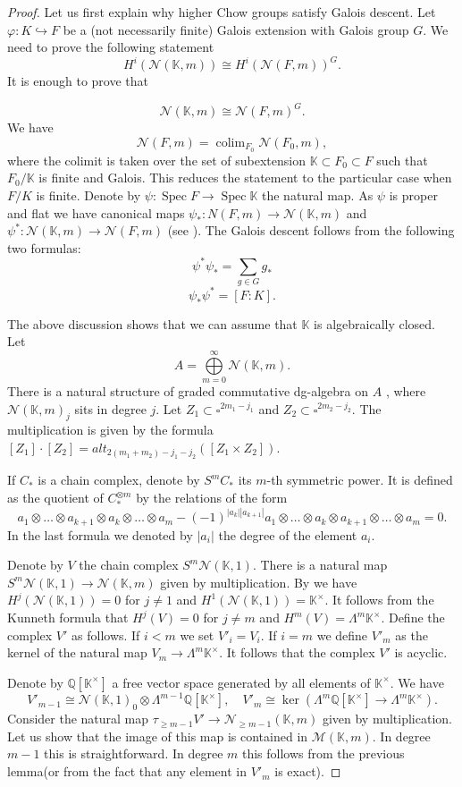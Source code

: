 \documentclass[12pt]{extarticle}
\def\mb{\mathbb}
\def\mc{\mathcal}
\def\k{\mb K}
\def\Q{\mb Q}
\def\ph{\varphi}
\def\N{\mc N}
\def\cl{\colon}
\def\emb{\hookrightarrow}
\def \M{\mc M}
\DeclareMathOperator*{\colim}{colim}
\DeclareMathOperator{\spec}{Spec}
\begin{document}
\begin{proof}
Let us first explain why higher Chow groups satisfy Galois descent. Let $\ph\cl K\emb F$ be a (not necessarily finite) Galois extension with Galois group $G$. We need to prove the following statement
    $$H^i(\N(\k,m))\cong H^i(\N(F,m))^G.$$
It is enough to prove that 

    $$\N(\k,m)\cong \N(F,m)^G.$$
We have 
    $$\N(F,m)=\colim_{F_0} \N(F_0,m),$$
    where the colimit is taken over the set of subextension $\k\subset F_0\subset F$ such that $F_0/\k$ is finite and Galois. This reduces the statement to the particular case when $F/K$ is finite. Denote by $\psi\colon \spec F\to \spec \k$ the natural map. As $\psi$ is proper and flat we have canonical maps $\psi_*\colon N(F,m)\to \N(\k,m)$ and $\psi^*\colon \N(\k,m)\to\N(F,m)$ (see \cite{bloch1986algebraic}). The Galois descent follows from the following two formulas:
    $$\psi^*\psi_*=\sum\limits_{g\in G}g_*$$
    $$\psi_*\psi^*=[F:K].$$


The above discussion shows that we can assume that $\k$ is algebraically closed. Let $$A=\bigoplus\limits_{m=0}^\infty \mc N(\k,m).$$
There is a natural structure of graded commutative dg-algebra on $A$ \cite{bloch_rriz_1994_mixed}, where $\mc N(\k,m)_j$ sits in degree $j$. Let $Z_1\subset \square^{2m_1-j_1}$ and $Z_2\subset \square^{2m_2-j_2}$. The multiplication is given by the formula $[Z_1]\cdot [Z_2]=alt_{2(m_1+m_2)-j_1-j_2}([Z_1\times Z_2])$. 

If $C_*$ is a chain complex, denote by $S^m C_*$ its $m$-th symmetric power. It is defined as the quotient of $C_*^{\otimes m}$ by the relations of the form $$a_1\otimes\dots \otimes a_{k+1}\otimes a_{k}\otimes\dots \otimes a_m-(-1)^{|a_k||a_{k+1}|}a_1\otimes\dots\otimes a_{k}\otimes a_{k+1}\otimes\dots \otimes a_m=0.$$
In the last formula we denoted by $|a_i|$ the degree of the element $a_i$. 

Denote by $V$ the chain complex $S^m\N(\k,1)$. There is a natural map $S^m\mc N(\k,1)\to \mc N(\k,m)$ given by multiplication. By \cite[Theorem 6.1]{bloch1986algebraic} we have $H^j(\N(\k,1))=0$ for $j\ne 1$ and $H^1(\N(\k,1))=\k^\times$. It follows from the Kunneth formula that $H^j(V)=0$ for $j\ne m$ and $H^m(V)=\Lambda^m \k^\times$. Define the complex $V'$ as follows. If $i< m$ we set $V'_i=V_i$. If $i=m$ we define $V'_m$ as the kernel of the natural map $V_m\to \Lambda^m\k^\times$. It follows that the complex $V'$ is acyclic. 

    Denote by $\Q[\k^\times]$ a free vector space generated by all elements of $\k^\times$.  We have
    $$V'_{m-1}\cong \mc N(\k,1)_0\otimes \Lambda^{m-1}\Q[\k^\times],\quad V'_{m}\cong \ker(\Lambda^m\Q[\k^\times]\to \Lambda^m\k^\times).$$
    Consider the natural map $\tau_{\geq m-1}V'\to \N_{\geq m-1}(\k,m)$ given by multiplication. Let us show that the image of this map is contained in $\M(\k,m)$. In degree $m-1$ this is straightforward. In degree $m$ this follows from the previous lemma(or from the fact that any element in $V'_m$ is exact).
    

\end{proof}
\end{document}
